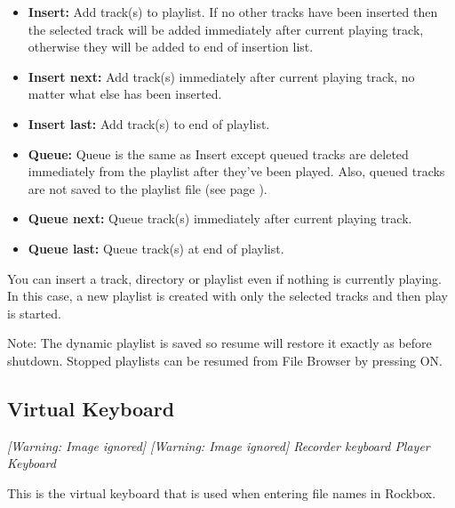 \begin{itemize}
\item \textbf{Insert:} Add track(s) to playlist. If no other tracks have been
inserted then the selected track will be added immediately after
current playing track, otherwise they will be added to end of insertion
list.
\item \textbf{Insert next: }Add track(s) immediately after current playing
track, no matter what else has been inserted.
\item \textbf{Insert last: }Add track(s) to end of playlist.
\item \textbf{Queue: } Queue is the same as Insert except queued
tracks are deleted immediately from the playlist after
they've been played. Also, queued tracks are not saved to the playlist file (see page \pageref{ref:playlistoptions}).
\item \textbf{Queue next:} Queue track(s) immediately after current playing
track.
\item \textbf{Queue last: }Queue track(s) at end of playlist.
\end{itemize}

You can insert a track, directory or playlist even if nothing is
currently playing. In this case, a new playlist is created with only
the selected tracks and then play is started.

Note: The dynamic playlist is saved so resume will restore it exactly as
before shutdown. Stopped playlists can be resumed from File Browser by
pressing ON.




\subsection{Virtual Keyboard}
{\centering\itshape
  [Warning: Image ignored] %
 \textmd{  }  [Warning: Image ignored]
 \newline
  Recorder keyboard  Player Keyboard  
\par}

This is the virtual keyboard that is used when entering file names in
Rockbox.

